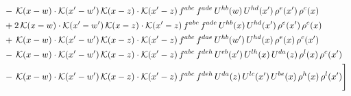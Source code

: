 \documentclass[10pt]{article}
\numberwithin{equation}{section}
\begin{document}
\begin{align}
&-\,\mathcal{K}(x-w)\cdot\mathcal{K}(x'-w')\,\mathcal{K}(x-z)\cdot\mathcal{K}(x'-z)\,f^{abc}\,f^{ade}\,U^{hb}(w)\,U^{hd}(x')\,\rho^{e}(x')\,\rho^{c}(x)\notag\\
&+2\,\mathcal{K}(x-w)\cdot\mathcal{K}(x'-w')\,\mathcal{K}(x-z)\cdot\mathcal{K}(x'-z)\,f^{abc}\,f^{ade}\,U^{hb}(x)\,U^{hd}(x')\,\rho^{e}(x')\,\rho^{c}(x)\notag\\
&+\,\mathcal{K}(x-w)\cdot\mathcal{K}(x'-w')\,\mathcal{K}(x-z)\cdot\mathcal{K}(x'-z)\,f^{abc}\,f^{dae}\,U^{hb}(w')\,U^{hd}(x)\,\rho^{e}(x)\,\rho^{c}(x')\notag\\
&-\,\mathcal{K}(x-w)\cdot\mathcal{K}(x'-w')\,\mathcal{K}(x-z)\cdot\mathcal{K}(x'-z)\,f^{abc}\,f^{deh}\,U^{eb}(x')\,U^{lh}(x)\,U^{da}(z)\,\rho^{l}(x)\,\rho^{c}(x')\notag\\
&-\,\mathcal{K}(x-w)\cdot\mathcal{K}(x'-w')\,\mathcal{K}(x-z)\cdot\mathcal{K}(x'-z)\,f^{abc}\,f^{deh}\,U^{da}(z)\,U^{lc}(x')\,U^{be}(x)\,\rho^{h}(x)\,\rho^{l}(x')\Bigg]
\end{align}
\end{document}

